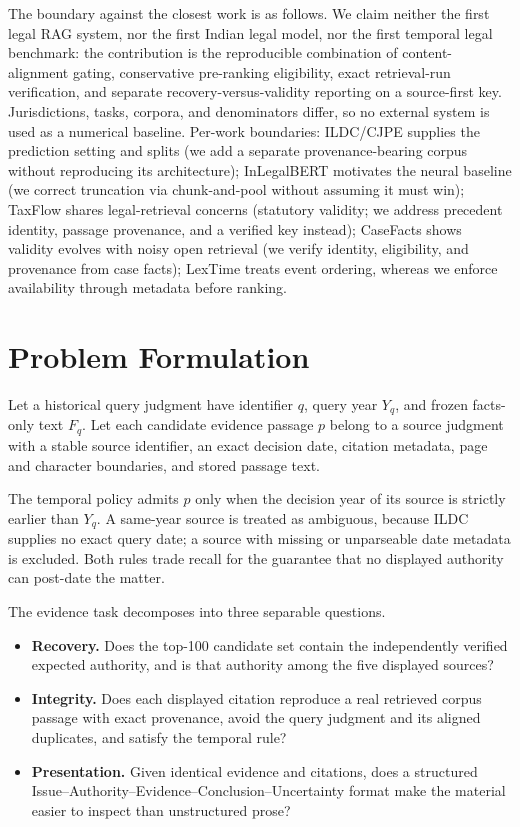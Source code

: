 \documentclass[conference]{IEEEtran}
\begin{document}
The boundary against
the closest work is as follows. We claim neither the first legal RAG system, nor the first
Indian legal model, nor the first temporal legal benchmark: the contribution is
the reproducible combination of content-alignment gating,
conservative pre-ranking eligibility, exact retrieval-run
verification, and separate recovery-versus-validity reporting on a source-first key.
Jurisdictions, tasks, corpora, and denominators differ, so no external system is
used as a numerical baseline. Per-work boundaries: ILDC/CJPE
\cite{malik2021} supplies the prediction setting and splits (we add a
separate provenance-bearing corpus without reproducing its architecture);
InLegalBERT \cite{paul2023} motivates the neural baseline (we correct
truncation via chunk-and-pool without assuming it must win); TaxFlow
\cite{taxflow2026} shares legal-retrieval concerns (statutory validity; we address
precedent identity, passage provenance, and a verified key instead);
CaseFacts \cite{casefacts2026} shows validity evolves with noisy open
retrieval (we verify identity, eligibility, and provenance from case facts);
LexTime \cite{lextime2025} treats event ordering, whereas we enforce
availability through metadata before ranking.

\section{Problem Formulation}
\label{sec:problem}

Let a historical query judgment have identifier $q$, query year $Y_q$, and
frozen facts-only text $F_q$. Let each candidate evidence passage $p$ belong to
a source judgment with a stable source identifier, an exact decision date,
citation metadata, page and character boundaries, and stored passage text.

The temporal policy admits $p$ only when the decision year of its source is
strictly earlier than $Y_q$. A same-year source is treated as ambiguous, because
ILDC supplies no exact query date; a source with missing or unparseable date
metadata is excluded. Both rules trade
recall for the guarantee that no displayed authority can post-date the matter.

The evidence task decomposes into three separable questions.

\begin{itemize}
\item \textbf{Recovery.} Does the top-100 candidate set contain the
independently verified expected authority, and is that authority among the five
displayed sources?
\item \textbf{Integrity.} Does each displayed citation reproduce a real
retrieved corpus passage with exact provenance, avoid the query judgment and its
aligned duplicates, and satisfy the temporal rule?
\item \textbf{Presentation.} Given identical evidence and citations, does a
structured Issue--Authority--Evidence--Conclusion--Uncertainty format make the
material easier to inspect than unstructured prose?
\end{itemize}
\end{document}
